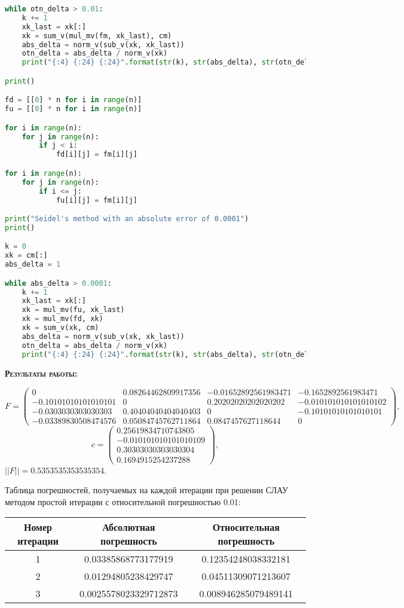 \documentclass [12pt]{article}
\begin{document}
\begin{lstlisting}[language=python]
while otn_delta > 0.01:
    k += 1
    xk_last = xk[:]
    xk = sum_v(mul_mv(fm, xk_last), cm)
    abs_delta = norm_v(sub_v(xk, xk_last))
    otn_delta = abs_delta / norm_v(xk)
    print("{:4} {:24} {:24}".format(str(k), str(abs_delta), str(otn_delta)))

print()

fd = [[0] * n for i in range(n)]
fu = [[0] * n for i in range(n)]

for i in range(n):
    for j in range(n):
        if j < i:
            fd[i][j] = fm[i][j]

for i in range(n):
    for j in range(n):
        if i <= j:
            fu[i][j] = fm[i][j]

print("Seidel's method with an absolute error of 0.0001")
print()

k = 0
xk = cm[:]
abs_delta = 1

while abs_delta > 0.0001:
    k += 1
    xk_last = xk[:]
    xk = mul_mv(fu, xk_last)
    xk = mul_mv(fd, xk)
    xk = sum_v(xk, cm)
    abs_delta = norm_v(sub_v(xk, xk_last))
    otn_delta = abs_delta / norm_v(xk)
    print("{:4} {:24} {:24}".format(str(k), str(abs_delta), str(otn_delta)))

\end{lstlisting}


\textsc{\textbf{Результаты работы:}}

\[
    F =
    \begin{pmatrix}
      0 & 0.08264462809917356 & -0.01652892561983471 & -0.1652892561983471\\
      -0.10101010101010101 & 0 & 0.20202020202020202 & -0.010101010101010102\\
      -0.0303030303030303 & 0.40404040404040403 & 0 & -0.10101010101010101\\
      -0.03389830508474576 & 0.05084745762711864 & 0.0847457627118644 & 0
    \end{pmatrix},
\]
\[
  c =
  \begin{pmatrix}
    0.25619834710743805 \\
    -0.010101010101010109 \\
    0.30303030303030304 \\
    0.1694915254237288
  \end{pmatrix},
\]
$||F|| = 0.5353535353535354$.

Таблица погрешностей, получаемых на каждой итерации при решении СЛАУ методом простой итерации с относительной погрешностью 0.01:
\begin{center}
\begin{tabular}{|c|c|c|}
\hline
Номер итерации & Абсолютная погрешность & Относительная погрешность \\
\hline
1 & 0.03385868773177919 & 0.12354248038332181\\
\hline
2 & 0.01294805238429747 & 0.04511309071213607\\
\hline
3 & 0.0025578023329712873 & 0.008946285079489141\\
\hline
\end{tabular}
\end{center}
\end{document}

